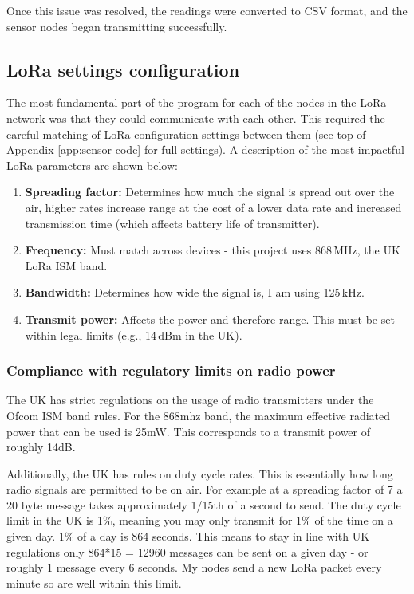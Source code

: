 Once this issue was resolved, the readings were converted to CSV format, and the
sensor nodes began transmitting successfully.

\subsection{LoRa settings configuration}

The most fundamental part of the program for each of the nodes in the LoRa
network was that they could communicate with each other. This required the
careful matching of LoRa configuration settings between them (see top of
Appendix \ref{app:sensor-code} for full settings). A description of the most
impactful LoRa parameters are shown below:

\begin{enumerate}
  \item \textbf{Spreading factor:} Determines how much the signal is spread out
  over the air, higher rates increase range at the cost of a lower data rate and
  increased transmission time (which affects battery life of transmitter).
  \item \textbf{Frequency:} Must match across devices - this project uses
        868\,MHz, the UK LoRa ISM band.
  \item \textbf{Bandwidth:} Determines how wide the signal is, I am using
        125\,kHz.
  \item \textbf{Transmit power:} Affects the power and therefore range. This
        must be set within legal limits (e.g., 14\,dBm in the UK).
\end{enumerate}

\subsubsection{Compliance with regulatory limits on radio
power}\label{sec:lora-limit}

The UK has strict regulations on the usage of radio transmitters under the Ofcom
ISM band rules. For the 868mhz band, the maximum effective radiated power that
can be used is 25mW. This corresponds to a transmit power of roughly 14dB.

Additionally, the UK has rules on duty cycle rates. This is essentially how long
radio signals are permitted to be on air. For example at a spreading factor of 7
a 20 byte message takes approximately 1/15th of a second to send. The duty cycle
limit in the UK is 1\%, meaning you may only transmit for 1\% of the time on a
given day. 1\% of a day is 864 seconds. This means to stay in line with UK
regulations only 864*15 = 12960 messages can be sent on a given day - or roughly
1 message every 6 seconds. My nodes send a new LoRa packet every minute so are
well within this limit.

